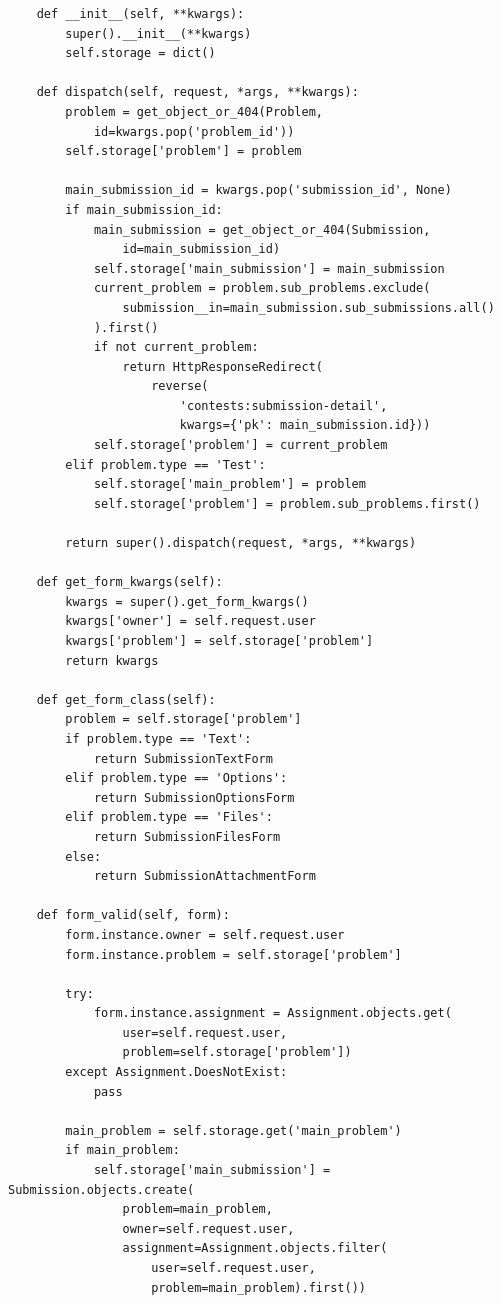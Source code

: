 \documentclass[a4paper]{article}
\begin{document}
\begin{enumerate}[wide, labelindent=0pt]
{\begin{verbatim}
    def __init__(self, **kwargs):
        super().__init__(**kwargs)
        self.storage = dict()

    def dispatch(self, request, *args, **kwargs):
        problem = get_object_or_404(Problem,
            id=kwargs.pop('problem_id'))
        self.storage['problem'] = problem

        main_submission_id = kwargs.pop('submission_id', None)
        if main_submission_id:
            main_submission = get_object_or_404(Submission, 
                id=main_submission_id)
            self.storage['main_submission'] = main_submission
            current_problem = problem.sub_problems.exclude(
                submission__in=main_submission.sub_submissions.all()
            ).first()
            if not current_problem:
                return HttpResponseRedirect(
                    reverse(
                        'contests:submission-detail',
                        kwargs={'pk': main_submission.id}))
            self.storage['problem'] = current_problem
        elif problem.type == 'Test':
            self.storage['main_problem'] = problem
            self.storage['problem'] = problem.sub_problems.first()

        return super().dispatch(request, *args, **kwargs)

    def get_form_kwargs(self):
        kwargs = super().get_form_kwargs()
        kwargs['owner'] = self.request.user
        kwargs['problem'] = self.storage['problem']
        return kwargs

    def get_form_class(self):
        problem = self.storage['problem']
        if problem.type == 'Text':
            return SubmissionTextForm
        elif problem.type == 'Options':
            return SubmissionOptionsForm
        elif problem.type == 'Files':
            return SubmissionFilesForm
        else:
            return SubmissionAttachmentForm

    def form_valid(self, form):
        form.instance.owner = self.request.user
        form.instance.problem = self.storage['problem']

        try:
            form.instance.assignment = Assignment.objects.get(
                user=self.request.user,
                problem=self.storage['problem'])
        except Assignment.DoesNotExist:
            pass

        main_problem = self.storage.get('main_problem')
        if main_problem:
            self.storage['main_submission'] = Submission.objects.create(
                problem=main_problem,
                owner=self.request.user,
                assignment=Assignment.objects.filter(
                    user=self.request.user,
                    problem=main_problem).first())


\end{verbatim}}
\end{enumerate}
\end{document}
